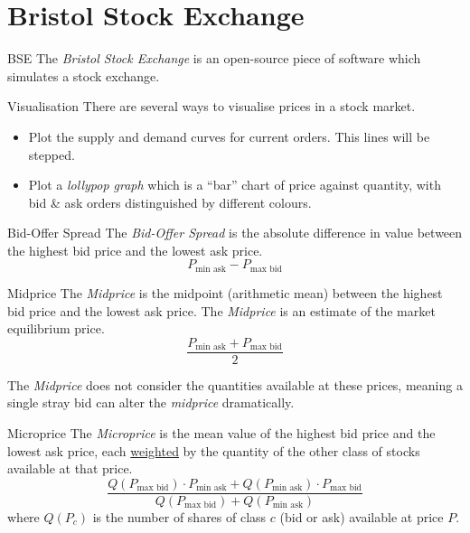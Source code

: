 \documentclass[11pt,a4paper]{article}
\begin{document}
\section{Bristol Stock Exchange}

  \begin{remark}{BSE}
    The \textit{Bristol Stock Exchange} is an open-source piece of software which simulates a stock exchange.
  \end{remark}

  \begin{remark}{Visualisation}
    There are several ways to visualise prices in a stock market.
    \begin{itemize}
      \item Plot the supply and demand curves for current orders. This lines will be stepped.
      \item Plot a \textit{lollypop graph} which is a ``bar'' chart of price against quantity, with bid \& ask orders distinguished by different colours.
    \end{itemize}
  \end{remark}

  \begin{definition}{Bid-Offer Spread}
    The \textit{Bid-Offer Spread} is the absolute difference in value between the highest bid price and the lowest ask price.
    \[ P_\text{min ask}-P_\text{max bid} \]
  \end{definition}

  \begin{definition}{Midprice}
    The \textit{Midprice} is the midpoint (arithmetic mean) between the highest bid price and the lowest ask price. The \textit{Midprice} is an estimate of the market equilibrium price.
    \[ \frac{P_\text{min ask}+P_\text{max bid}}2 \]
    \par The \textit{Midprice} does not consider the quantities available at these prices, meaning a single stray bid can alter the \textit{midprice} dramatically.
  \end{definition}

  \begin{definition}{Microprice}
    The \textit{Microprice} is the mean value of the highest bid price and the lowest ask price, each \underline{weighted} by the quantity of the other class of stocks available at that price.
    \[ \frac{Q(P_\text{max bid})\cdot P_\text{min ask}+Q(P_\text{min ask})\cdot P_\text{max bid}}{Q(P_\text{max bid})+Q(P_\text{min ask})} \]
    where $Q(P_c)$ is the number of shares of class $c$ (bid or ask) available at price $P$.
  \end{definition}
\end{document}

